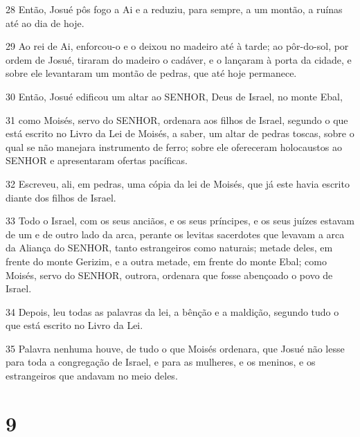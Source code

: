 \par 28 Então, Josué pôs fogo a Ai e a reduziu, para sempre, a um montão, a ruínas até ao dia de hoje.
\par 29 Ao rei de Ai, enforcou-o e o deixou no madeiro até à tarde; ao pôr-do-sol, por ordem de Josué, tiraram do madeiro o cadáver, e o lançaram à porta da cidade, e sobre ele levantaram um montão de pedras, que até hoje permanece.
\par 30 Então, Josué edificou um altar ao SENHOR, Deus de Israel, no monte Ebal,
\par 31 como Moisés, servo do SENHOR, ordenara aos filhos de Israel, segundo o que está escrito no Livro da Lei de Moisés, a saber, um altar de pedras toscas, sobre o qual se não manejara instrumento de ferro; sobre ele ofereceram holocaustos ao SENHOR e apresentaram ofertas pacíficas.
\par 32 Escreveu, ali, em pedras, uma cópia da lei de Moisés, que já este havia escrito diante dos filhos de Israel.
\par 33 Todo o Israel, com os seus anciãos, e os seus príncipes, e os seus juízes estavam de um e de outro lado da arca, perante os levitas sacerdotes que levavam a arca da Aliança do SENHOR, tanto estrangeiros como naturais; metade deles, em frente do monte Gerizim, e a outra metade, em frente do monte Ebal; como Moisés, servo do SENHOR, outrora, ordenara que fosse abençoado o povo de Israel.
\par 34 Depois, leu todas as palavras da lei, a bênção e a maldição, segundo tudo o que está escrito no Livro da Lei.
\par 35 Palavra nenhuma houve, de tudo o que Moisés ordenara, que Josué não lesse para toda a congregação de Israel, e para as mulheres, e os meninos, e os estrangeiros que andavam no meio deles.

\chapter{9}

